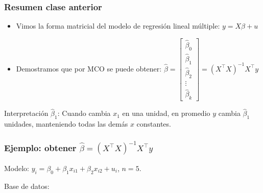 \documentclass{beamer}
\begin{document}
\begin{frame}[shrink=10]

\frametitle{Resumen clase anterior}

\begin{itemize}
    \item Vimos la forma matricial del modelo de regresión lineal múltiple: $y = X\beta + u$
    \item Demostramos que por MCO se puede obtener: $\hat{\beta} = \begin{bmatrix} \hat{\beta}_0 \\ \hat{\beta}_1 \\ \hat{\beta}_2 \\ \vdots \\ \hat{\beta}_k \end{bmatrix} = (X^\top X)^{-1}X^\top y$
\end{itemize}

Interpretación $\hat{\beta}_1$: Cuando cambia $x_1$ en una unidad, en promedio $y$ cambia $\hat{\beta}_1$ unidades, manteniendo todas las demás $x$ constantes.

\end{frame}
\begin{frame}[shrink=10]
\frametitle{Ejemplo: obtener $\hat{\beta} = (X^\top X)^{-1}X^\top y$}

Modelo: $y_i = \beta_0 + \beta_1 x_{i1} + \beta_2 x_{i2} + u_i$, $n=5$.

Base de datos: \begin{center}
\end{center}

\end{frame}
\end{document}
